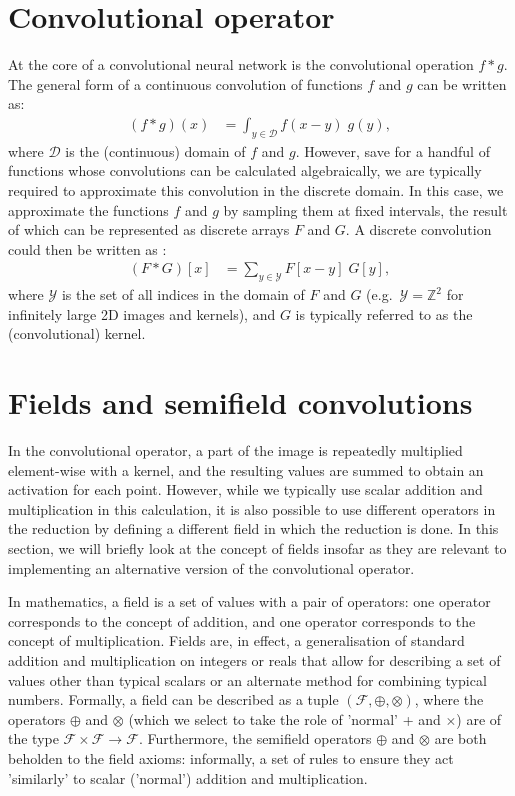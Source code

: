 \documentclass[a4paper, 12pt]{report}
\begin{document}
\section{Convolutional operator}
At the core of a convolutional neural network is the convolutional operation $f*g$. The general form of a continuous convolution of functions $f$ and $g$ can be written as:
\begin{align}
(f*g)(x) &= \int_{y\in\mathcal{D}} f(x-y)\; g(y)	,
\end{align}
where $\mathcal{D}$ is the (continuous) domain of $f$ and $g$. However, save for a handful of functions whose convolutions can be calculated algebraically, we are typically required to approximate this convolution in the discrete domain. In this case, we approximate the functions $f$ and $g$ by sampling them at fixed intervals, the result of which can be represented as discrete arrays $F$ and $G$. A discrete convolution could then be written as \cite{szeliski2022computer}:
\begin{align}
(F*G)[x] &= \sum_{y\in\mathcal{Y}} F[x-y]\; G[y],
\end{align}
where $\mathcal{Y}$ is the set of all indices in the domain of $F$ and $G$ (e.g.\ $\mathcal{Y}=\mathbb{Z}^2$ for infinitely large 2D images and kernels), and $G$ is typically referred to as the (convolutional) kernel.


\section{Fields and semifield convolutions}
In the convolutional operator, a part of the image is repeatedly multiplied element-wise with a kernel, and the resulting values are summed to obtain an activation for each point. However, while we typically use scalar addition and multiplication in this calculation, it is also possible to use different operators in the reduction by defining a different field in which the reduction is done. In this section, we will briefly look at the concept of fields insofar as they are relevant to implementing an alternative version of the convolutional operator.

In mathematics, a field is a set of values with a pair of operators: one operator corresponds to the concept of addition, and one operator corresponds to the concept of multiplication. Fields are, in effect, a generalisation of standard addition and multiplication on integers or reals that allow for describing a set of values other than typical scalars or an alternate method for combining typical numbers. Formally, a field can be described as a tuple $(\mathcal{F}, \oplus, \otimes)$, where the operators $\oplus$ and $\otimes$ (which we select to take the role of 'normal' + and $\times$) are of the type $\mathcal{F}\times\mathcal{F}\rightarrow\mathcal{F}$. Furthermore, the semifield operators $\oplus$ and $\otimes$ are both beholden to the field axioms: informally, a set of rules to ensure they act 'similarly' to scalar ('normal') addition and multiplication. 
\end{document}
